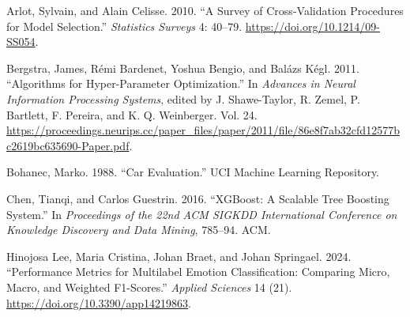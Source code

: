 \documentclass[
]{article}
\newlength{\cslhangindent}
\newenvironment{CSLReferences}[2] %
 {\begin{list}{}{%
  \setlength{\itemindent}{0pt}
  \setlength{\leftmargin}{0pt}
  \setlength{\parsep}{0pt}
  \ifodd #1
   \setlength{\leftmargin}{\cslhangindent}
   \setlength{\itemindent}{-1\cslhangindent}
  \fi
  \setlength{\itemsep}{#2\baselineskip}}}
 {\end{list}}
\begin{document}
\label{refs}
\begin{CSLReferences}{1}{0}
Arlot, Sylvain, and Alain Celisse. 2010. {``A Survey of Cross-Validation
Procedures for Model Selection.''} \emph{Statistics Surveys} 4: 40--79.
\url{https://doi.org/10.1214/09-SS054}.

Bergstra, James, Rémi Bardenet, Yoshua Bengio, and Balázs Kégl. 2011.
{``Algorithms for Hyper-Parameter Optimization.''} In \emph{Advances in
Neural Information Processing Systems}, edited by J. Shawe-Taylor, R.
Zemel, P. Bartlett, F. Pereira, and K. Q. Weinberger. Vol. 24.
\url{https://proceedings.neurips.cc/paper_files/paper/2011/file/86e8f7ab32cfd12577bc2619bc635690-Paper.pdf}.

Bohanec, Marko. 1988. {``Car Evaluation.''} UCI Machine Learning
Repository.

Chen, Tianqi, and Carlos Guestrin. 2016. {``XGBoost: A Scalable Tree
Boosting System.''} In \emph{Proceedings of the 22nd ACM SIGKDD
International Conference on Knowledge Discovery and Data Mining},
785--94. ACM.

Hinojosa Lee, Maria Cristina, Johan Braet, and Johan Springael. 2024.
{``Performance Metrics for Multilabel Emotion Classification: Comparing
Micro, Macro, and Weighted F1-Scores.''} \emph{Applied Sciences} 14
(21). \url{https://doi.org/10.3390/app14219863}.

\end{CSLReferences}
\end{document}
